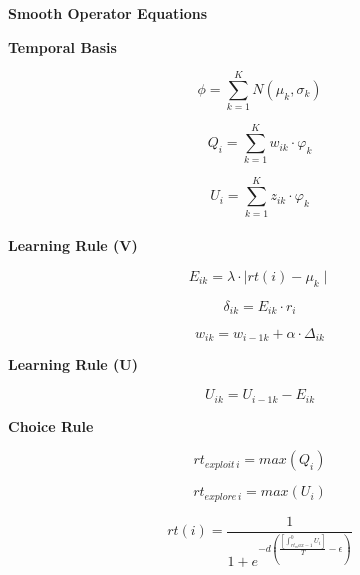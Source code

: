 \documentclass[fleqn]{article}
\begin{document}
\begin{center}
\textbf{Smooth Operator Equations} \newline
\end{center}

\begin{multicols}{2} %
\textbf{Temporal Basis}

\begin{equation*}
  \phi=\displaystyle\sum_{k=1}^{K} N (\mu_k , \sigma_k)
\end{equation*}

\begin{equation*}
 Q_i=\displaystyle\sum_{k=1}^{K}  w_{ik} \cdot \varphi_k
\end{equation*}

\begin{equation*}
  U_i=\displaystyle\sum_{k=1}^{K}  z_{ik} \cdot \varphi_k
\end{equation*}\\

\textbf{Learning Rule (V)}

\begin{equation*}
  E_{ik}=\lambda \cdot \mid rt(i) - \mu_k \mid
\end{equation*}

\begin{equation*}
  \delta_{ik}=E_{ik} \cdot r_i
\end{equation*}

\begin{equation*}
  w_{ik}=w_{i-1k} + \alpha \cdot \Delta_{ik}
\end{equation*}

\columnbreak

\textbf{Learning Rule (U)}

\begin{equation*}
  U_{ik}=U_{i-1k} -  E_{ik}
\end{equation*}

\textbf{Choice Rule}

\begin{equation*}
  rt_{exploit\, i} = max(Q_i)
\end{equation*}

\begin{equation*}
  rt_{explore\,  i} = max(U_i)
\end{equation*}

\begin{equation*}
  rt(i) = \frac{1}{1+e^{-d \left (\frac{\left [\int^0_{rt_max - 1}U_i \right ]}{T} - \epsilon \right )}}
\end{equation*}


\end{multicols}
\end{document}
